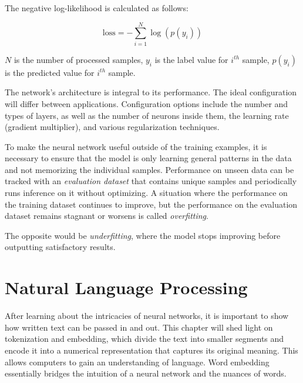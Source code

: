 The negative log-likelihood is calculated as follows:

\begin{equation}
  \text{loss} = -\sum_{i=1}^{N} \log(p(y_i))
\end{equation}

$N$ is the number of processed samples, $y_{i}$ is the label value for $i^{th}$ sample, $p(y_i)$ is the predicted value for $i^{th}$ sample.

The network's architecture is integral to its performance. The ideal configuration will differ between applications. Configuration options include the number and types of layers, as well as the number of neurons inside them, the learning rate (gradient multiplier), and various regularization techniques.

\medskip
To make the neural network useful outside of the training examples, it is necessary to ensure that the model is only learning general patterns in the data and not memorizing the individual samples. Performance on unseen data can be tracked with an \emph{evaluation dataset} that contains unique samples and periodically runs inference on it without optimizing. A situation where the performance on the training dataset continues to improve, but the performance on the evaluation dataset remains stagnant or worsens is called \emph{overfitting}.

The opposite would be \emph{underfitting}, where the model stops improving before outputting satisfactory results.

\chapter{Natural Language Processing}
\label{sec:data_representation}
After learning about the intricacies of neural networks, it is important to show how written text can be passed in and out. This chapter will shed light on tokenization and embedding, which divide the text into smaller segments and encode it into a numerical representation that captures its original meaning. This allows computers to gain an understanding of language. Word embedding essentially bridges the intuition of a neural network and the nuances of words.

